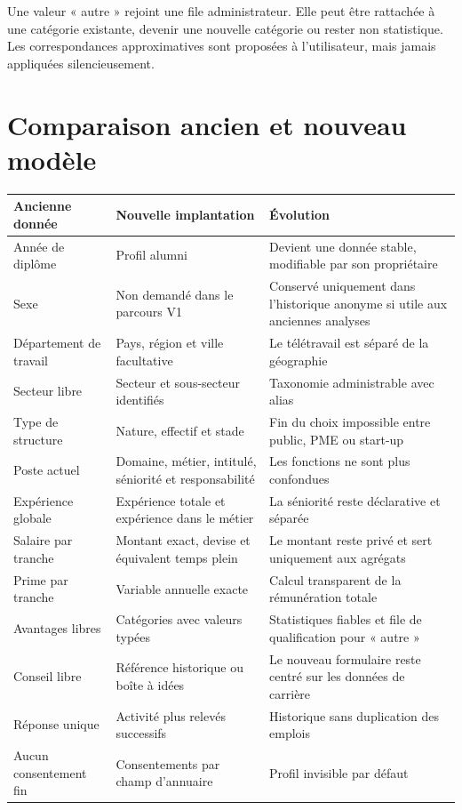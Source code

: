 \documentclass[11pt,a4paper]{article}
\begin{document}
Une valeur « autre » rejoint une file administrateur. Elle peut être rattachée à
une catégorie existante, devenir une nouvelle catégorie ou rester non
statistique. Les correspondances approximatives sont proposées à l'utilisateur,
mais jamais appliquées silencieusement.

\section{Comparaison ancien et nouveau modèle}

\small
\begin{longtable}{@{}L{36mm}L{51mm}L{75mm}@{}}
  \toprule
  \textbf{Ancienne donnée} & \textbf{Nouvelle implantation} & \textbf{Évolution} \\
  \midrule
  \endhead
  Année de diplôme & Profil alumni & Devient une donnée stable, modifiable par son propriétaire \\
  Sexe & Non demandé dans le parcours V1 & Conservé uniquement dans l'historique anonyme si utile aux anciennes analyses \\
  Département de travail & Pays, région et ville facultative & Le télétravail est séparé de la géographie \\
  Secteur libre & Secteur et sous-secteur identifiés & Taxonomie administrable avec alias \\
  Type de structure & Nature, effectif et stade & Fin du choix impossible entre public, PME ou start-up \\
  Poste actuel & Domaine, métier, intitulé, séniorité et responsabilité & Les fonctions ne sont plus confondues \\
  Expérience globale & Expérience totale et expérience dans le métier & La séniorité reste déclarative et séparée \\
  Salaire par tranche & Montant exact, devise et équivalent temps plein & Le montant reste privé et sert uniquement aux agrégats \\
  Prime par tranche & Variable annuelle exacte & Calcul transparent de la rémunération totale \\
  Avantages libres & Catégories avec valeurs typées & Statistiques fiables et file de qualification pour « autre » \\
  Conseil libre & Référence historique ou boîte à idées & Le nouveau formulaire reste centré sur les données de carrière \\
  Réponse unique & Activité plus relevés successifs & Historique sans duplication des emplois \\
  Aucun consentement fin & Consentements par champ d'annuaire & Profil invisible par défaut \\
  \bottomrule
\end{longtable}
\normalsize
\end{document}
